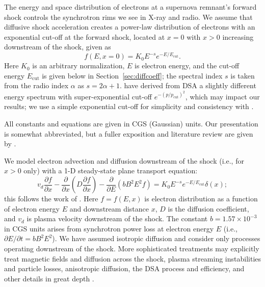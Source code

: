 \documentclass[iop, apj, numberedappendix]{emulateapj}
\newcommand*{\mt}{\mathrm}
\newcommand*{\ptl}{\partial}
\newcommand*{\Ecut}{E_{\mt{cut}}}
\begin{document}
The energy and space distribution of electrons at a supernova remnant's forward
shock controls the synchrotron rims we see in X-ray and radio.  We assume that
diffusive shock acceleration creates a power-law distribution of electrons with
an exponential cut-off at the forward shock, located at $x = 0$ with $x > 0$
increasing downstream of the shock, given as
\begin{equation}
    f(E, x=0) = K_0 E^{-s} e^{-E/\Ecut} .
\end{equation}
Here $K_0$ is an arbitrary normalization, $E$ is electron energy, and the
cut-off energy $\Ecut$ is given below in Section~\ref{sec:diffcoeff}; the
spectral index $s$ is taken from the radio index $\alpha$ as $s = 2\alpha + 1$.
\citet{zirakashvili2007} have derived from DSA a slightly different energy
spectrum with super-exponential cut-off $e^{-(p/p_{\mt{cut}})^2}$, which may
impact our results; we use a simple exponential cut-off for simplicity and
consistency with .

All constants and equations are given in CGS (Gaussian) units.  Our
presentation is somewhat abbreviated, but a fuller exposition and literature
review are given by .

We model electron advection and diffusion downstream of the shock (i.e., for
$x>0$ only) with a 1-D steady-state plane transport equation:
\begin{equation} \label{eq:model}
    v_d \frac{\ptl f}{\ptl x}
    - \frac{\ptl}{\ptl x} \left(D\frac{\ptl f}{\ptl x}\right)
    - \frac{\ptl}{\ptl E} \left(bB^2E^2f\right)
    = K_0 E^{-s} e^{-E/\Ecut} \delta(x) ;
\end{equation}
this follows the work of \citet{webb1984, berezhko2004, cassam-chenai2007,
morlino2010, rettig2012}.  Here $f = f(E,x)$ is electron distribution as a
function of electron energy $E$ and downstream distance $x$, $D$ is the
diffusion coefficient, and $v_d$ is plasma velocity downstream of the shock.
The constant $b = 1.57 \times 10^{-3}$ in CGS units arises from synchrotron
power loss at electron energy $E$ (i.e., $\ptl E/\ptl t = b B^2 E^2$).
We have assumed isotropic diffusion and consider only processes operating
downstream of the shock.  More sophisticated treatments may explicitly treat
magnetic fields and diffusion across the shock, plasma streaming instabilities
and particle losses, anisotropic diffusion, the DSA process and efficiency, and
other details in great depth \citep[e.g.,][and references therein]{reville2013,
bykov2014, ferrand2014}.
\end{document}
